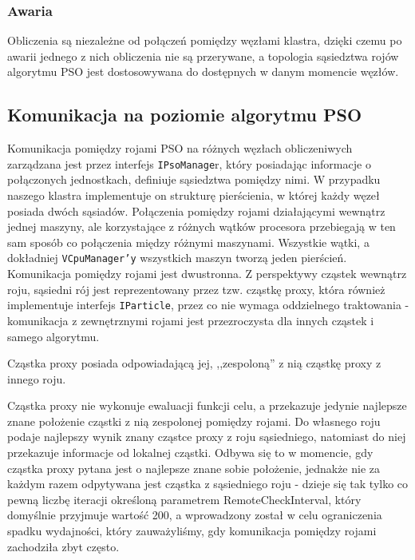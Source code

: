 \documentclass[12pt, twoside, openany, abstract=on]{report}
\theoremstyle{definition}
\begin{document}

\subsubsection{Awaria}
Obliczenia są niezależne od połączeń pomiędzy węzłami klastra, dzięki czemu po awarii jednego z nich obliczenia nie są przerywane, a topologia sąsiedztwa rojów algorytmu PSO jest dostosowywana do dostępnych w danym momencie węzłów.

\subsection{Komunikacja na poziomie algorytmu PSO}
Komunikacja pomiędzy rojami PSO na różnych węzłach obliczeniwych zarządzana jest przez interfejs \texttt{IPsoManage}r, który posiadając informacje o połączonych jednostkach, definiuje sąsiedztwa pomiędzy nimi. W przypadku naszego klastra implementuje on strukturę pierścienia, w której każdy węzeł posiada dwóch sąsiadów. Połączenia pomiędzy rojami działającymi wewnątrz jednej maszyny, ale korzystające z różnych wątków procesora przebiegają w ten sam sposób co połączenia między różnymi maszynami. Wszystkie wątki, a dokładniej \texttt{VCpuManager'y} wszystkich maszyn tworzą jeden pierścień. Komunikacja pomiędzy rojami jest dwustronna. Z perspektywy cząstek wewnątrz roju, sąsiedni rój jest reprezentowany przez tzw. cząstkę proxy, która również implementuje interfejs \texttt{IParticle}, przez co nie wymaga oddzielnego traktowania - komunikacja z zewnętrznymi rojami jest przezroczysta dla innych cząstek i samego algorytmu. 

Cząstka proxy posiada odpowiadającą jej, ,,zespoloną'' z nią cząstkę proxy z innego roju.

Cząstka proxy nie wykonuje ewaluacji funkcji celu, a przekazuje jedynie najlepsze znane położenie cząstki z nią zespolonej pomiędzy rojami. Do własnego roju podaje najlepszy wynik znany cząstce proxy z roju sąsiedniego, natomiast do niej przekazuje informacje od lokalnej cząstki. Odbywa się to w momencie, gdy cząstka proxy pytana jest o najlepsze znane sobie położenie, jednakże nie za każdym razem odpytywana jest cząstka z sąsiedniego roju - dzieje się tak tylko co pewną liczbę iteracji określoną parametrem RemoteCheckInterval, który domyślnie przyjmuje wartość 200, a wprowadzony został w celu ograniczenia spadku wydajności, który zauważyliśmy, gdy komunikacja pomiędzy rojami zachodziła zbyt często.
\end{document}
